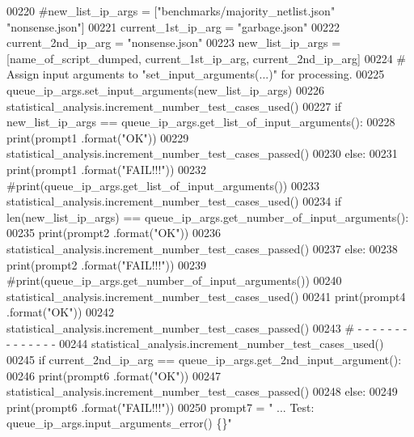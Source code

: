 \begin{DoxyCode}
00220         \textcolor{comment}{#new\_list\_ip\_args = ["benchmarks/majority\_netlist.json" "nonsense.json"]}
00221         current\_1st\_ip\_arg = \textcolor{stringliteral}{"garbage.json"}
00222         current\_2nd\_ip\_arg = \textcolor{stringliteral}{"nonsense.json"}
00223         new\_list\_ip\_args = [name\_of\_script\_dumped, current\_1st\_ip\_arg, current\_2nd\_ip\_arg]
00224         \textcolor{comment}{#   Assign input arguments to "set\_input\_arguments(...)" for processing.}
00225         queue\_ip\_args.set\_input\_arguments(new\_list\_ip\_args)
00226         statistical\_analysis.increment\_number\_test\_cases\_used()
00227         \textcolor{keywordflow}{if} new\_list\_ip\_args == queue\_ip\_args.get\_list\_of\_input\_arguments():
00228             print(prompt1 .format(\textcolor{stringliteral}{"OK"}))
00229             statistical\_analysis.increment\_number\_test\_cases\_passed()
00230         \textcolor{keywordflow}{else}:
00231             print(prompt1 .format(\textcolor{stringliteral}{"FAIL!!!"}))
00232             \textcolor{comment}{#print(queue\_ip\_args.get\_list\_of\_input\_arguments())}
00233         statistical\_analysis.increment\_number\_test\_cases\_used()
00234         \textcolor{keywordflow}{if} len(new\_list\_ip\_args) == queue\_ip\_args.get\_number\_of\_input\_arguments():
00235             print(prompt2 .format(\textcolor{stringliteral}{"OK"}))
00236             statistical\_analysis.increment\_number\_test\_cases\_passed()
00237         \textcolor{keywordflow}{else}:
00238             print(prompt2 .format(\textcolor{stringliteral}{"FAIL!!!"}))
00239             \textcolor{comment}{#print(queue\_ip\_args.get\_number\_of\_input\_arguments())}
00240         statistical\_analysis.increment\_number\_test\_cases\_used()
00241         print(prompt4 .format(\textcolor{stringliteral}{"OK"}))
00242         statistical\_analysis.increment\_number\_test\_cases\_passed()
00243         \textcolor{comment}{#   -   -   -   -   -   -   -   -   -   -   -   -   -   -}
00244         statistical\_analysis.increment\_number\_test\_cases\_used()
00245         \textcolor{keywordflow}{if} current\_2nd\_ip\_arg == queue\_ip\_args.get\_2nd\_input\_argument():
00246             print(prompt6 .format(\textcolor{stringliteral}{"OK"}))
00247             statistical\_analysis.increment\_number\_test\_cases\_passed()
00248         \textcolor{keywordflow}{else}:
00249             print(prompt6 .format(\textcolor{stringliteral}{"FAIL!!!"}))
00250         prompt7 = \textcolor{stringliteral}{" ... Test: queue\_ip\_args.input\_arguments\_error() \{\}"}

\end{DoxyCode}

